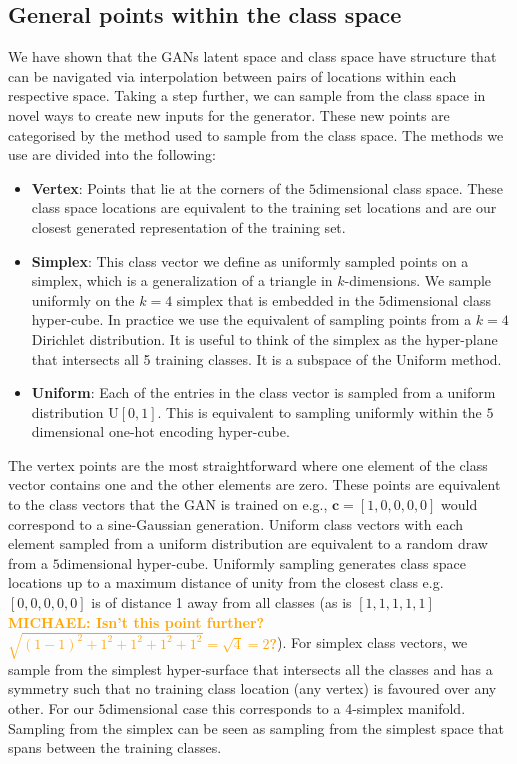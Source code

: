 \documentclass[12pt]{iopart}
\newcommand{\michael}[1]{\textbf{\textcolor{orange}{MICHAEL: #1}}}
\newcommand{\ndimensional}[1]{$#1$\nobreakdash\discretionary{-}{-}{-}dimensional}
\begin{document}
\subsection{General points within the class space}
We have shown that the \acp{GAN} latent space and class space have structure that can be navigated via interpolation between pairs of locations within each respective space. Taking a step further, we can sample from the class space in novel ways to create new inputs for the generator. These new points are categorised by the method used to sample from the class space. The methods we use are divided into the following: 
%
\begin{itemize}
%
\item {\bf Vertex}: Points that lie at the corners of the \ndimensional{5} class space. These class space locations are equivalent to the training set locations and are our closest generated representation of the training set.
%
\item {\bf Simplex}: This class vector we define as uniformly sampled points on a simplex, which is a generalization of a triangle in $k$-dimensions. We sample uniformly on the $k=4$ simplex that is embedded in the \ndimensional{5} class hyper-cube. In practice we use the equivalent of sampling points from a $k=4$ Dirichlet distribution. It is useful to think of the simplex as the hyper-plane that intersects all 5 training classes. It is a subspace of the Uniform method.  
%
\item {\bf Uniform}: Each of the entries in the class vector is sampled from a uniform distribution $\text{U}[0,1]$. This is equivalent to sampling uniformly within the \ndimensional{5} one-hot encoding hyper-cube.
%
\end{itemize}

The vertex points are the most straightforward where one element of the class vector contains one and the other elements are zero. These points are equivalent to the class vectors that the \ac{GAN} is trained on e.g., $\mathbf{c} = [1,0,0,0,0]$ would correspond to a sine-Gaussian generation. Uniform class vectors with each element sampled from a uniform distribution are equivalent to a random draw from a \ndimensional{5} hyper-cube. Uniformly sampling generates class space locations up to a maximum distance of unity from the closest class e.g. $[0,0,0,0,0]$ is of distance 1 away from all classes (as is $[1,1,1,1,1]$ \michael{Isn't this point further? $\sqrt{(1-1)^2 + 1^2 + 1^2 + 1^2 + 1^2} = \sqrt{4} = 2$?}). For simplex class vectors, we sample from the simplest hyper-surface that intersects all the classes and has a symmetry such that no training class location (any vertex) is favoured over any other. For our \ndimensional{5} case this corresponds to a 4-simplex manifold. Sampling from the simplex can be seen as sampling from the simplest space that spans between the training classes.   
\end{document}
